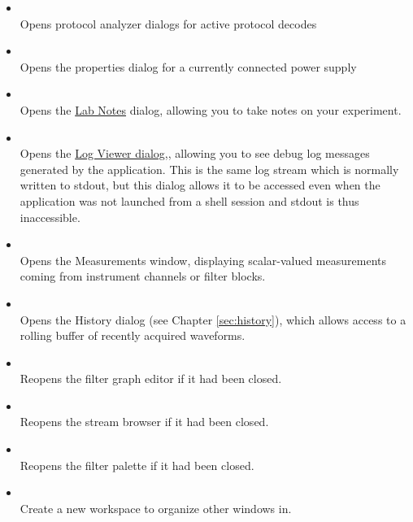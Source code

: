 \begin{itemize}

\item {}\\
Opens protocol analyzer dialogs for active protocol decodes

\item {}\\
Opens the properties dialog for a currently connected power supply

\item {}\\
Opens the \hyperref[dlg:labnotes]{Lab Notes} dialog, allowing you to take notes on your experiment.

\item {}\\
Opens the \hyperref[dlg:logviewer]{Log Viewer dialog,},  allowing you to see debug log messages generated by the
application. This is the same log stream which is normally written to stdout, but this dialog allows it to be accessed
even when the application was not launched from a shell session and stdout is thus inaccessible.

\item {}\\
Opens the Measurements window, displaying scalar-valued measurements coming from instrument channels or filter blocks.

\item {}\\
Opens the History dialog (see Chapter \ref{sec:history}), which allows access to a rolling buffer of recently acquired
waveforms.

\item {}\\
Reopens the filter graph editor if it had been closed.

\item {}\\
Reopens the stream browser if it had been closed.

\item {}\\
Reopens the filter palette if it had been closed.

\item {}\\
Create a new workspace to organize other windows in.

\end{itemize}

